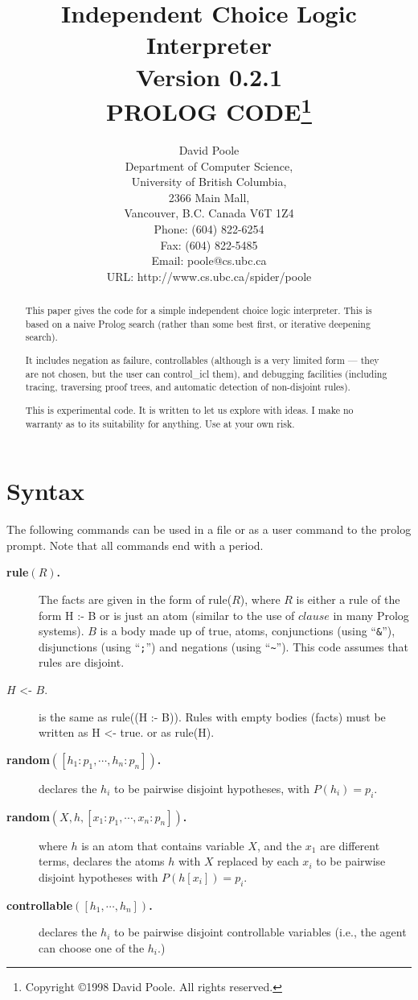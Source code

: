 \documentclass[11pt,fleqn]{article}
\title{Independent Choice Logic Interpreter\\Version 0.2.1
\\PROLOG CODE\thanks{Copyright \copyright 1998 David Poole. All rights
reserved.}}
\author{David Poole\\
Department of Computer Science,\\
University of British Columbia,\\
2366 Main Mall,\\
Vancouver, B.C. Canada V6T 1Z4\\
Phone: (604) 822-6254\\
Fax: (604) 822-5485\\
Email: {\ttfamily poole@cs.ubc.ca}\\
URL: {\ttfamily http://www.cs.ubc.ca/spider/poole}}
\newcommand{\btt}{\ttfamily\bfseries}
\begin{document}
\maketitle
\begin{abstract}
This paper gives the code for a simple independent choice logic
\cite{Poole97b,Poole98a} interpreter. This is based on a naive Prolog
search (rather than some best first, or iterative deepening search).

It includes negation as failure,
controllables (although is a very limited form --- they are
not chosen, but the user can control_icl them), and debugging facilities
(including tracing, traversing proof trees, and automatic detection
of non-disjoint rules).

This is experimental code. It is written to let us explore with
ideas. I make no warranty as to its suitability for anything. Use at
your own risk.
\end{abstract}
\newpage
\section{Syntax} \label{vocabulary}
The following commands can be used in a file or
as a user command to the prolog prompt. Note that all commands end with a period.
\begin{description}
\item[{\btt rule$(R)$.}]
The facts are
given in the form of {\ttfamily rule($R$)}, where $R$ is either a rule of
the form {\ttfamily H :- B} or is just an atom (similar to the use of
$clause$ in many Prolog systems). $B$ is a body made up of {\ttfamily
true}, atoms, conjunctions (using ``\verb|&|''), disjunctions (using
``\verb|;|'') and negations (using ``\verb|~|''). This code assumes
that rules are disjoint. 
\item[{\ttfamily $H$ <- $B$.}] is the same as {\ttfamily rule((H :-
B))}. Rules with empty 
bodies (facts) must be written as {\ttfamily H <- true.} or as
{\ttfamily rule(H).} 
\item[{\btt random$([h_1:p_1,\cdots,h_n:p_n])$.}]declares
the $h_i$ to be pairwise disjoint hypotheses, with $P(h_i)=p_i$. 
\item[{\btt random$(X,h,[x_1:p_1,\cdots,x_n:p_n])$.}]
where $h$ is an atom that contains variable $X$, and the $x_1$ are
different terms, declares the atoms $h$ with $X$ replaced by each
$x_i$ to be pairwise disjoint hypotheses with $P(h[x_i])=p_i$.
\item[{\btt controllable$([h_1,\cdots,h_n])$.}]declares
the $h_i$ to be pairwise disjoint controllable variables (i.e., the
agent can choose one of the $h_i$.)
\end{description}
\end{document}
